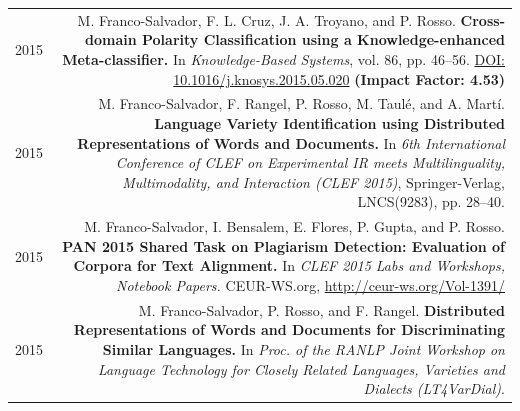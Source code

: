 \documentclass[10pt]{article}
\begin{document}
\begin{tabular}{L!{\VRule}R}
	2015&M. Franco-Salvador, F. L. Cruz, J. A. Troyano, and P. Rosso. \textbf{Cross-domain Polarity Classification using a Knowledge-enhanced Meta-classifier.}	
	In \emph{Knowledge-Based Systems}, vol. 86, pp. 46--56. \href{http://dx.doi.org/10.1016/j.knosys.2015.05.020}{DOI: 10.1016/j.knosys.2015.05.020} \textbf{(Impact Factor: 4.53)} \vspace{5pt}\\
	2015&M. Franco-Salvador, F. Rangel, P. Rosso, M. Taul{\'e}, and A. Mart{\'i}. \textbf{Language Variety Identification using Distributed Representations of Words and Documents.}
	In \emph{6th International Conference of CLEF on Experimental IR meets Multilinguality, Multimodality, and Interaction (CLEF 2015)}, Springer-Verlag, LNCS(9283), pp. 28--40. \vspace{5pt}\\
	2015&M. Franco-Salvador, I. Bensalem, E. Flores, P. Gupta, and P. Rosso. \textbf{PAN 2015 Shared Task on Plagiarism Detection: Evaluation of Corpora for Text Alignment.}
	In \emph{CLEF 2015 Labs and Workshops, Notebook Papers.} CEUR-WS.org, \href{http://ceur-ws.org/Vol-1391/}{http://ceur-ws.org/Vol-1391/} \vspace{5pt}\\
	2015&M. Franco-Salvador, P. Rosso, and F. Rangel. \textbf{Distributed Representations of Words and Documents for Discriminating Similar Languages.}
	In \emph{Proc. of the RANLP Joint Workshop on Language Technology for Closely Related Languages, Varieties and Dialects (LT4VarDial)}. \vspace{5pt}\\
\end{tabular}
\end{document}
